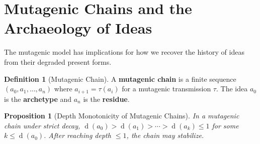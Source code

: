 \documentclass[11pt,openany]{book}
\theoremstyle{definition}
\newtheorem{definition}[axiom]{Definition}
\theoremstyle{plain}
\newtheorem{proposition}[axiom]{Proposition}
\theoremstyle{remark}
\newcommand{\depth}{\operatorname{d}}       %
\newcommand{\transmit}{\tau}                 %
\begin{document}
\section{Mutagenic Chains and the Archaeology of Ideas}

The mutagenic model has implications for how we recover the history of ideas from their degraded present forms.

\begin{definition}[Mutagenic Chain]
A \textbf{mutagenic chain} is a finite sequence $(a_0, a_1, \ldots, a_n)$ where $a_{i+1} = \transmit(a_i)$ for a mutagenic transmission $\transmit$. The idea $a_0$ is the \textbf{archetype} and $a_n$ is the \textbf{residue}.
\end{definition}

\begin{proposition}[Depth Monotonicity of Mutagenic Chains]
In a mutagenic chain under strict decay, $\depth(a_0) > \depth(a_1) > \cdots > \depth(a_k) \leq 1$ for some $k \leq \depth(a_0)$. After reaching depth $\leq 1$, the chain may stabilize.
\end{proposition}
\end{document}
